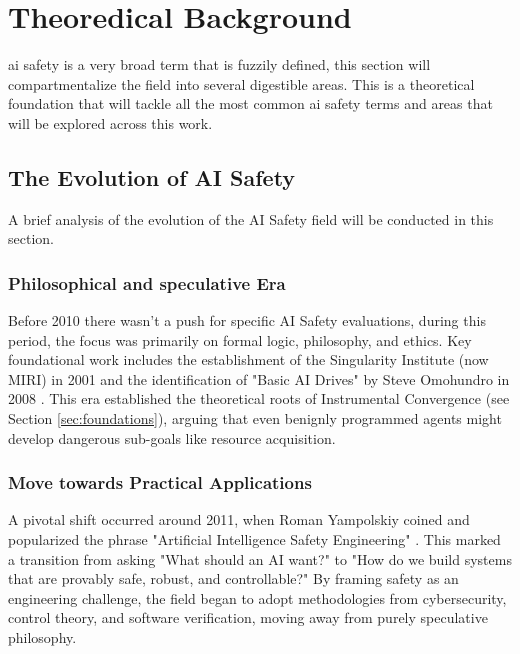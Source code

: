 \chapter{Theoredical Background}\label{chap:theoredical_background}

	\gls{ai} safety is a very broad term that is fuzzily defined, this section will compartmentalize the field into several digestible areas. This is a theoretical foundation that will tackle all the most common \gls{ai} safety terms and areas that will be explored across this work.


	\section{The Evolution of AI Safety}
	A brief analysis of the evolution of the AI Safety field will be conducted in this section.
	
	\subsection{Philosophical and speculative Era}

	Before 2010 there wasn't a push for specific AI Safety evaluations, during this period, the focus was primarily on formal logic, philosophy, and ethics. Key foundational work includes the establishment of the Singularity Institute (now MIRI) in 2001 and the identification of "Basic AI Drives" by Steve Omohundro in 2008 \cite{omohundro2008basic}. This era established the theoretical roots of Instrumental Convergence (see Section \ref{sec:foundations}), arguing that even benignly programmed agents might develop dangerous sub-goals like resource acquisition.
	\subsection{Move towards Practical Applications}
	A pivotal shift occurred around 2011, when Roman Yampolskiy coined and popularized the phrase "Artificial Intelligence Safety Engineering" \cite{yampolskiy_controllability_2022}. This marked a transition from asking "What should an AI want?" to "How do we build systems that are provably safe, robust, and controllable?" By framing safety as an engineering challenge, the field began to adopt methodologies from cybersecurity, control theory, and software verification, moving away from purely speculative philosophy.
